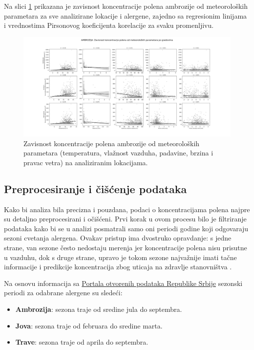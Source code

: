 \documentclass[12pt]{article}
\begin{document}
Na slici \ref{fig:ambrozija_meteo_gradovi} prikazana je zavisnost koncentracije polena ambrozije od meteoroloških parametara za sve analizirane lokacije i alergene, zajedno sa regresionim linijama i vrednostima Pirsonovog koeficijenta korelacije za svaku promenljivu.

\begin{figure}[H]
    \centering
    \includegraphics[width=1\textwidth]{grafici/ambrozija_meteo_gradovi.png}
    \caption{Zavisnost koncentracije polena ambrozije od meteoroloških parametara (temperatura, vlažnost vazduha, padavine, brzina i pravac vetra) na analiziranim lokacijama.}
    \label{fig:ambrozija_meteo_gradovi}
\end{figure}


\subsection{Preprocesiranje i čišćenje podataka}

Kako bi analiza bila precizna i pouzdana, podaci o koncentracijama polena najpre su detaljno preprocesirani i očišćeni. Prvi korak u ovom procesu bilo je filtriranje podataka kako bi se u analizi posmatrali samo oni periodi godine koji odgovaraju sezoni cvetanja alergena. Ovakav pristup ima dvostruko opravdanje: s jedne strane, van sezone često nedostaju merenja jer koncentracije polena nisu prisutne u vazduhu, dok s druge strane, upravo je tokom sezone najvažnije imati tačne informacije i predikcije koncentracija zbog uticaja na zdravlje stanovništva \cite{damato2007, who2003}.

Na osnovu informacija sa \href{https://data.gov.rs/sr/datasets/polen-objedinjeni-podatsi-od-2016-godine/}{Portala otvorenih podataka Republike Srbije} sezonski periodi za odabrane alergene su sledeći:

\begin{itemize}
    \item \textbf{Ambrozija}: sezona traje od sredine jula do septembra.
    \item \textbf{Jova}: sezona traje od februara do sredine marta.
    \item \textbf{Trave}: sezona traje od aprila do septembra.
\end{itemize}
\end{document}
